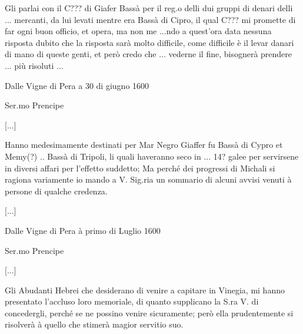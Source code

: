 Gli parlai con  il C??? di Giafer Bassà per il  reg.o delli dui gruppi
di  denari delli  ...  mercanti,  da lui  levati mentre  era  Bassà di
Cipro, il qual C??? mi promette di far ogni buon officio, et opera, ma
non me ...ndo a quest'ora data nessuna risposta dubito che la risposta
sarà  molto difficile, come  difficile è  il levar  danari di  mano di
queste  genti,  et però  credo  che  ...  vederne il  fine,  bisognerà
prendere ... più risoluti ...

\stopcifrato

Dalle Vigne di Pera a 30 di giugno 1600


\setcounter{docnumber}{28}


\tuttocifrato

\begin{center}
Ser.mo Prencipe
\end{center}

[...]

Hanno medesimamente destinati per Mar  Negro Giaffer fu Bassà di Cypro
et Memy(?)  .. Bassà di  Tripoli, li quali  haveranno seco in  ... 14?
galee  per servirsene  in diversi  affari per  l'effetto  suddetto; Ma
perché  dei progressi  di Michali  si  ragiona variamente  io mando  a
V. Sig.ria  un sommario di alcuni  avvisi venuti à  persone di qualche
credenza.

[...]

\stopcifrato

Dalle Vigne di Pera à primo di Luglio 1600


\setcounter{docnumber}{34}


\tuttocifrato

\begin{center}
Ser.mo Prencipe
\end{center}

[...]

Gli Abudanti Hebrei che desiderano di venire a capitare in Vinegia, mi
hanno  presentato l'accluso  loro memoriale,  di quanto  supplicano la
S.ra V. di concedergli, perché  se ne possino venire sicuramente; però
ella prudentemente  si risolverà à quello che  stimerà magior servitio
suo.

